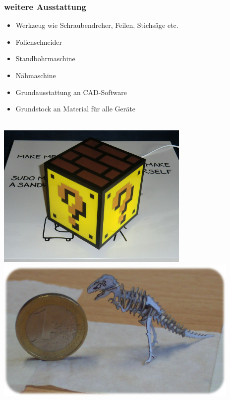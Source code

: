 \documentclass[t]{beamer}
\begin{document}
\begin{frame}
    \frametitle{weitere Ausstattung}
    \begin{itemize}
        \item Werkzeug wie Schraubendreher, Feilen, Stichsäge etc.
        \item Folienschneider
        \item Standbohrmaschine
        \item Nähmaschine
        \item Grundausstattung an CAD-Software
        \item Grundstock an Material für alle Geräte
    \end{itemize}
    \begin{center}
        ~\\

        \includegraphics[height=7cm]{../img/mariolampe.jpg}
        \hspace{1em}
        \includegraphics[height=7cm]{../img/tinysaur.jpg}
    \end{center}
\end{frame}
\end{document}
